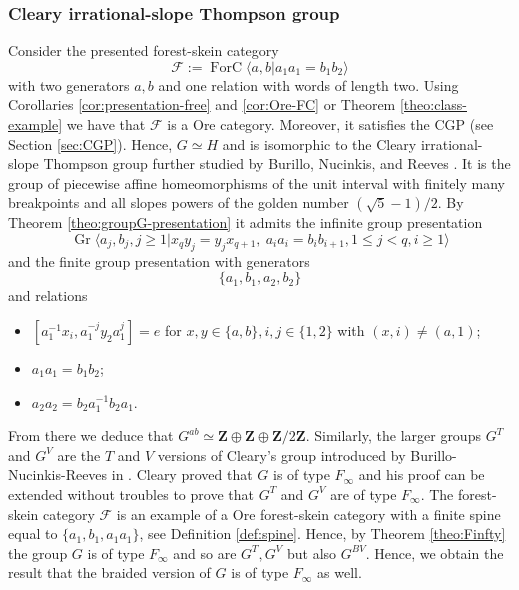 \documentclass[a4paper, 12pt]{amsart}
\numberwithin{equation}{section}
\theoremstyle{definition}
\newcommand{\cF}{\mathcal F}
\DeclareMathOperator{\FC}{ForC}
\DeclareMathOperator{\Gr}{Gr}
\newcommand{\la}{\langle}
\newcommand{\ra}{\rangle}
\newcommand{\Z}{\mathbf{Z}}
\begin{document}
\subsubsection{Cleary irrational-slope Thompson group}
Consider the presented forest-skein category
$$\cF:=\FC\la a,b| a_1a_1=b_1b_2\ra$$
with two generators $a,b$ and one relation with words of length two.
Using Corollaries \ref{cor:presentation-free} and \ref{cor:Ore-FC} or Theorem \ref{theo:class-example} we have that $\cF$ is a Ore category.
Moreover, it satisfies the CGP (see Section \ref{sec:CGP}).
Hence, $G\simeq H$ and is isomorphic to the Cleary irrational-slope Thompson group further studied by Burillo, Nucinkis, and Reeves \cite{Cleary00,Burillo-Nucinkis-Reeves21}.
It is the group of piecewise affine homeomorphisms of the unit interval with finitely many breakpoints and all slopes powers of the golden number $(\sqrt 5 -1 )/2.$
By Theorem \ref{theo:groupG-presentation} it admits the infinite group presentation
$$\Gr\la a_j,b_j, j\geq 1| x_qy_j=y_j x_{q+1}, \ a_ia_i = b_ib_{i+1}, 1\leq j<q, i\geq 1\ra$$
and the finite group presentation with generators
$$\{a_1,b_1,a_2,b_2\}$$
and relations
\begin{itemize}
\item $[a_1^{-1}x_i, a_1^{-j} y_2 a_1^j]=e$ for $x,y\in\{a,b\}, i,j\in\{1,2\}$ with $(x,i)\neq (a,1)$;
\item  $a_1a_1=b_1b_2$;
\item $a_2a_2=b_2a_1^{-1}b_2a_1$.
\end{itemize}
From there we deduce that $G^{ab}\simeq \Z\oplus\Z\oplus\Z/2\Z.$
Similarly, the larger groups $G^T$ and $G^V$ are the $T$ and $V$ versions of Cleary's group introduced by Burillo-Nucinkis-Reeves in \cite{Burillo-Nucinkis-Reeves22}.
Cleary proved that $G$ is of type $F_\infty$ and his proof can be extended without troubles to prove that $G^T$ and $G^V$ are of type $F_\infty$. 
The forest-skein category $\cF$ is an example of a Ore forest-skein category with a finite spine equal to $\{a_1,b_1, a_1a_1\}$, see Definition \ref{def:spine}.
Hence, by Theorem \ref{theo:Finfty} the group $G$ is of type $F_\infty$ and so are $G^T,G^V$ but also $G^{BV}.$
Hence, we obtain the result that the braided version of $G$ is of type $F_\infty$ as well.
\end{document}
